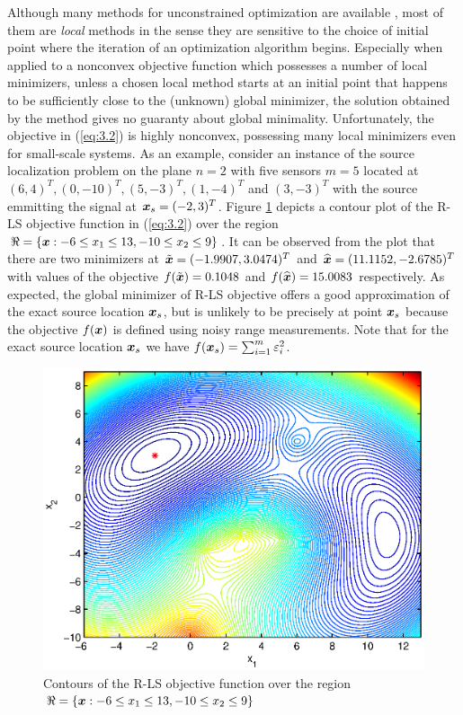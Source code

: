 Although many methods for unconstrained optimization are available \cite{AntonLu}, most of them are \textit{local} methods in the sense they are sensitive to the choice of initial point where the iteration of an optimization algorithm begins. Especially when applied to a nonconvex objective function which possesses a number of local minimizers, unless a chosen local method starts at an initial point that happens to be sufficiently close to the (unknown) global minimizer, the solution obtained by the method gives no guaranty about global minimality. Unfortunately, the objective in (\ref{eq:3.2}) is highly nonconvex, possessing many local minimizers even for small-scale systems. As an example, consider an instance of the source localization problem on the plane $n = 2$ with five sensors $ m = 5$ located at $(6,4)^T, (0,-10)^T, (5,-3)^T, (1,-4)^T$ and  $(3,-3)^T$ with the source emmitting the signal at $\mbox{\boldmath$x$}_s = (-2,3)^T$. Figure \ref{fig:ExampleOfRLSNonconvexity} depicts a contour plot of the R-LS objective function in (\ref{eq:3.2}) over the region $\Re = \{\mbox{\boldmath$x$}: -6 \leq x_1 \leq 13, -10 \leq x_2 \leq 9 \}$. It can be observed from the plot that there are two minimizers at $\tilde{\mbox{\boldmath$x$}} = (-1.9907, 3.0474)^T$ and $\widehat{\mbox{\boldmath$x$}} = (11.1152, -2.6785)^T$ with values of the objective  $f(\tilde{\mbox{\boldmath$x$}}) = 0.1048 $ and $f(\widehat{\mbox{\boldmath$x$}}) = 15.0083$ respectively. As expected, the global minimizer of R-LS objective offers a good approximation of the exact source location $\mbox{\boldmath$x$}_s$, but is unlikely to be precisely at point $\mbox{\boldmath$x$}_s$ because the objective $f(\mbox{\boldmath$x$})$ is defined using noisy range measurements. Note that for the exact source location $\mbox{\boldmath$x$}_s$ we have $f(\mbox{\boldmath$x$}_s) = \sum_{i=1}^m \varepsilon_i^2$.

\begin{figure}[t]
\centering
  \includegraphics{figures/nonconvexity_example_ls_new_range}
\caption{Contours of the R-LS objective function over the region $\protect\Re = \protect\lbrace \protect\mbox{\boldmath$x$}:-6\protect\leq x_1 \protect\leq 13, -10\protect\leq x_2 \protect\leq 9 \protect\rbrace$}
\label{fig:ExampleOfRLSNonconvexity}
\end{figure}

